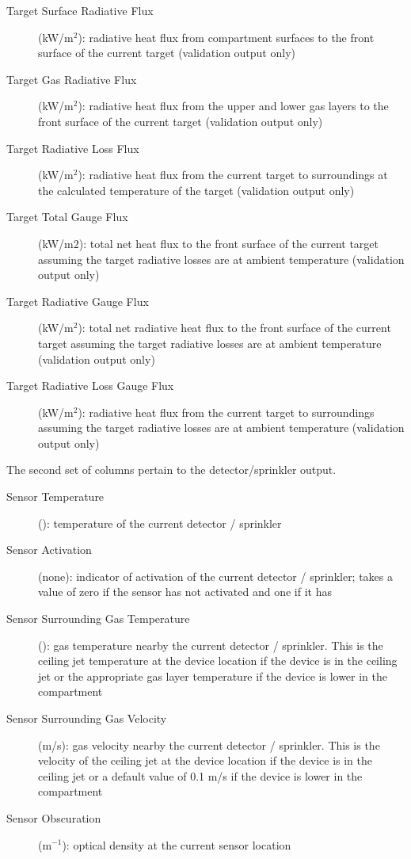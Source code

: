 \begin{description}
\item[Target Surface Radiative Flux] (kW/m$^2$): radiative heat flux from compartment surfaces to the front surface of the current target (validation output only)
\item[Target Gas Radiative Flux] (kW/m$^2$):   radiative heat flux from the upper and lower gas layers to the front surface of the current target (validation output only)
\item[Target Radiative Loss Flux] (kW/m$^2$):   radiative heat flux from the current target to surroundings at the calculated temperature of the target (validation output only)
\item[Target Total Gauge Flux] (kW/m$2$): total net heat flux to the front surface of the current target assuming the target radiative losses are at ambient temperature (validation output only)
\item[Target Radiative Gauge Flux] (kW/m$^2$): total net radiative heat flux to the front surface of the current target assuming the target radiative losses are at ambient temperature (validation output only)
\item[Target Radiative Loss Gauge Flux] (kW/m$^2$):   radiative heat flux from the current target to surroundings assuming the target radiative losses are at ambient temperature (validation output only)
\end{description}

The second set of columns pertain to the detector/sprinkler output.

\begin{description}
\item[Sensor Temperature] (\degc): temperature of the current detector / sprinkler
\item[Sensor Activation] (none): indicator of activation of the current detector / sprinkler; takes a value of zero if the sensor has not activated and one if it has
\item[Sensor Surrounding Gas Temperature] (\degc): gas temperature nearby the current detector / sprinkler. This is the ceiling jet temperature at the device location if the device is in the ceiling jet or the appropriate gas layer temperature if the device is lower in the compartment
\item[Sensor Surrounding Gas Velocity] (m/s): gas velocity nearby the current detector / sprinkler. This is the velocity of the ceiling jet at the device location if the device is in the ceiling jet or a default value of 0.1 m/s if the device is lower in the compartment
\item[Sensor Obscuration] (m$^{-1}$):  optical density at the current sensor location
\end{description}

